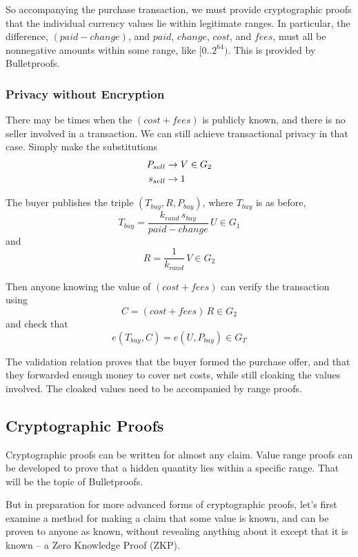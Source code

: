 \documentclass{yellowpaper}
\begin{document}
So accompanying the purchase transaction, we must provide cryptographic proofs that the individual currency values lie within legitimate ranges. In particular, the difference, $(paid - change)$, and $paid$,  $change$, $cost$, and $fees$, must all be nonnegative amounts within some range, like $[0..2^{64})$.   This is provided by Bulletproofs. 

\subsubsection{Privacy without Encryption}
There may be times when the $(cost + fees)$ is publicly known, and there is no seller involved in a transaction. We can still achieve transactional privacy in that case. Simply make the substitutions
\begin{align}
P_{sell} &\to V \in G_2 \notag \\
s_{sell} &\to 1 \notag
\end{align}

The buyer publishes the triple $(T_{buy},R, P_{buy})$, where $T_{buy}$ is as before,
$$ T_{buy} = \frac{k_{rand} \, s_{buy}}{paid - change} \, U \in G_1$$
and
$$ R = \frac{1}{k_{rand}}\,V \in G_2$$

Then anyone knowing the value of $(cost + fees)$ can verify the transaction using
$$C = (cost + fees) \, R \in G_2$$
and check that
$$ e(T_{buy},C) = e(U,P_{buy}) \in G_T$$

The validation relation proves that the buyer formed the purchase offer, and that they forwarded enough money to cover net costs, while still cloaking the values involved. The cloaked values need to be accompanied by range proofs.

\subsection{Cryptographic Proofs}
Cryptographic proofs can be written for almost any claim. Value range proofs can be developed to prove that a hidden quantity lies within a specific range. That will be the topic of Bulletproofs. 

But in preparation for more advanced forms of cryptographic proofs, let's first examine a method for making a claim that some value is known, and can be proven to anyone as known, without  revealing anything about it except that it is known -- a Zero Knowledge Proof (ZKP).
\end{document}

